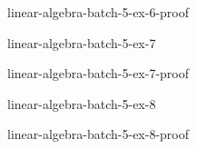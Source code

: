 \documentclass[preview]{standalone}
\begin{document}
\begin{snippetsolution}{linear-algebra-batch-5-ex-6-proof}{}
    \todo
\end{snippetsolution}

\begin{snippetexercise}{linear-algebra-batch-5-ex-7}{}
    \todo
\end{snippetexercise}

\begin{snippetsolution}{linear-algebra-batch-5-ex-7-proof}{}
    \todo
\end{snippetsolution}

\begin{snippetexercise}{linear-algebra-batch-5-ex-8}{}
    \todo
\end{snippetexercise}

\begin{snippetsolution}{linear-algebra-batch-5-ex-8-proof}{}
    \todo
\end{snippetsolution}
\end{document}

